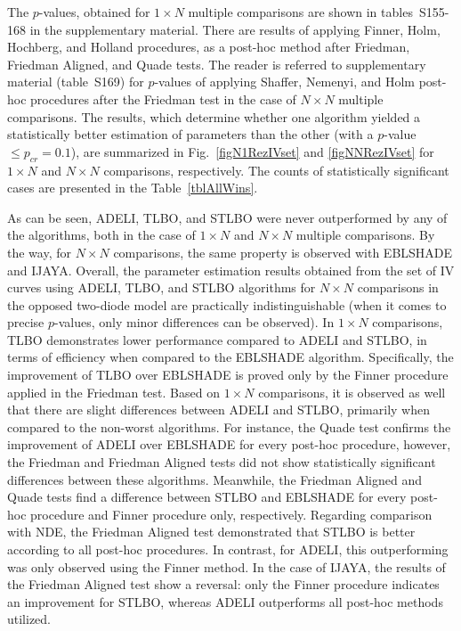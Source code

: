 \documentclass[a4paper,fleqn]{cas-dc}
\begin{document}

The $p$-values, obtained for $1\times N$ multiple comparisons are shown in tables~S155-168 in the supplementary material.
There are results of applying  Finner, Holm, Hochberg, and Holland procedures,
as a post-hoc method after Friedman, Friedman Aligned, and Quade tests.
The reader is referred to supplementary material (table~S169) for $p$-values of
applying  Shaffer, Nemenyi, and Holm post-hoc procedures after the Friedman test in the
case of $N\times N$ multiple comparisons.
The results, which determine whether one algorithm yielded a statistically better estimation of parameters
than the other (with a $p$-value $\leq p_{cr}=0.1$), are summarized in Fig.~\ref{figN1RezIVset} and \ref{figNNRezIVset}
for $1\times N$ and $N\times N$ comparisons, respectively.
The counts of statistically  significant cases are presented in the Table~\ref{tblAllWins}.

As can be seen,
ADELI, TLBO, and STLBO were never outperformed by any of the algorithms,
both in the case of $1\times N$ and $N\times N$ multiple comparisons.
By the way, for $N\times N$ comparisons, the same property is observed with EBLSHADE and IJAYA.
Overall, the parameter estimation results obtained from the set of IV curves
using ADELI, TLBO, and STLBO algorithms for $N\times N$ comparisons in the opposed two-diode model are practically indistinguishable
(when it comes to precise $p$-values, only minor differences can be observed).
In $1\times N$ comparisons, TLBO demonstrates lower performance compared to ADELI and STLBO,
in terms of efficiency when compared to the EBLSHADE algorithm.
Specifically, the improvement of TLBO over EBLSHADE is proved only by the Finner procedure applied in the Friedman test.
Based on $1\times N$ comparisons, it is observed as well that there are slight differences between ADELI and STLBO, 
primarily when compared to the non-worst algorithms.
For instance, the Quade test confirms the improvement of ADELI over EBLSHADE for every post-hoc procedure,
however, the Friedman and Friedman Aligned tests did not show statistically significant differences between these algorithms.
Meanwhile, the Friedman Aligned and Quade tests find a difference between STLBO and EBLSHADE 
for every post-hoc procedure and Finner procedure only, respectively.
Regarding comparison with NDE, the Friedman Aligned test demonstrated that STLBO is better according to all post-hoc procedures. 
In contrast, for ADELI, this outperforming was only observed using the Finner method.
In the case of IJAYA, 
the results of the Friedman Aligned test show a reversal: 
only the Finner procedure indicates an improvement for STLBO, 
whereas ADELI outperforms all post-hoc methods utilized.
\end{document}
